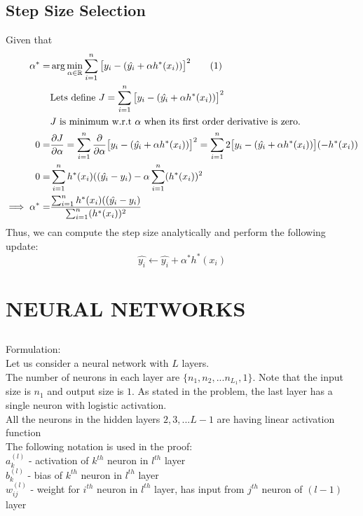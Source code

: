 \documentclass[letter,doc,notimes]{article}
\newcommand\numberthis{\addtocounter{equation}{1}\tag{\theequation}}
\begin{document}
\subsection {Step Size Selection}
Given that \\
\begin{align*}
	\alpha^* = & \arg \min_{\alpha \in \mathbb{R}} \sum_{i=1}^{n} \big[y_i - (\hat{y_i} + \alpha h^*(x_i)) \big]^2 \numberthis \\ \label{eqn:bestalpha1}
	& \text{Lets define } J = \sum_{i=1}^{n} \big[y_i - (\hat{y_i} + \alpha h^*(x_i)) \big]^2 \\
	& \text{$J$ is minimum w.r.t $\alpha$ when its first order derivative is zero.} \\
 0 = & \frac{\partial J}{\partial \alpha} = \sum_{i=1}^{n}  \frac{\partial }{\partial \alpha} \big[y_i - (\hat{y_i} + \alpha h^*(x_i)) \big]^2  = \sum_{i=1}^{n}  2 \big[y_i - (\hat{y_i} + \alpha h^*(x_i)) \big] (- h^*(x_i))\\
 0 = &   \sum_{i=1}^{n}  h^*(x_i)((\hat{y_i} - y_i) - \alpha  \sum_{i=1}^{n} (h^*(x_i) )^2 \\
 \implies \alpha^* =&  \frac{ \sum_{i=1}^{n}  h^*(x_i)((\hat{y_i} - y_i)}{\sum_{i=1}^{n} (h^*(x_i) )^2 } %
\end{align*}
Thus, we can compute the step size analytically and perform the following update:
$$
	\hat{y_i} \leftarrow \hat{y_i} + \alpha^* h^*(x_i)
$$

\section{ NEURAL NETWORKS}
\subsection{}
Formulation: \\
Let us consider a neural network with $L$ layers. \\
The number of neurons in each layer are $\{n_1, n_2, ... n_{L_1} , 1\}$. Note that the input size is $n_1$ and output size is $1$.
As stated in the problem, the last layer has a single neuron with logistic activation. \\
All the neurons in the hidden layers $2, 3, ... L-1$ are having linear activation function \\
The following notation is used in the proof: \\
$a^{(l)}_k$ - activation of $k^{th}$  neuron in $l^{th}$ layer \\
$b^{(l)}_k$ - bias of $k^{th}$  neuron in $l^{th}$ layer  \\
$w^{(l)}_{ij}$ - weight for $i^{th}$  neuron in $l^{th}$ layer, has input from $j^{th}$ neuron of $(l-1)$ layer \\
\end{document}
